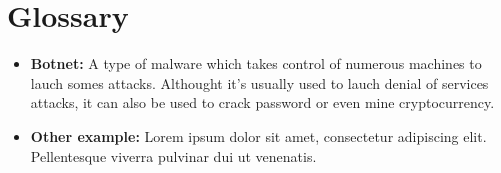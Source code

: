 \documentclass[../main.tex]{subfiles}
\begin{document}
	\chapter*{Glossary}

	\begin{itemize}

		\item \textbf{Botnet:} A type of malware which takes control of numerous machines to lauch somes attacks. Althought it's usually used to lauch denial of services attacks, it can also be used to crack password or even mine cryptocurrency.

		\item \textbf{Other example:} Lorem ipsum dolor sit amet, consectetur adipiscing elit. Pellentesque viverra pulvinar dui ut venenatis.



	\end{itemize}

	\vspace{10pt}
\end{document}
